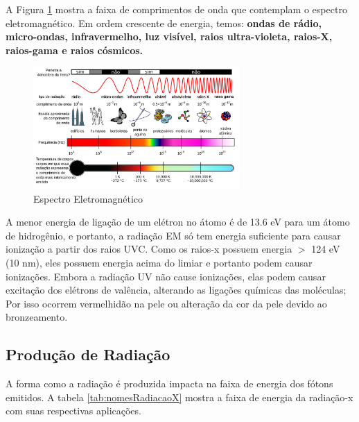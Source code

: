 \documentclass[11pt,a4paper]{article}
\begin{document}
                A Figura \ref{fig:espectroEM} mostra a faixa de comprimentos de onda que contemplam o espectro eletromagnético. Em ordem crescente de energia, temos: \textbf{ondas de rádio, micro-ondas, infravermelho, luz visível, raios ultra-violeta, raios-X, raios-gama e raios cósmicos.}

                \begin{figure}[h]
                    \centering
                    \includegraphics[width=0.7\textwidth]{Imagens/espectroEM.jpg}
                    \caption{Espectro Eletromagnético}
                    \label{fig:espectroEM}
                \end{figure}

                 A menor energia de ligação de um elétron no átomo é de 13.6 eV para um átomo de hidrogênio, e portanto, a radiação EM só tem energia suficiente para causar ionização a partir dos raios UVC. Como os raios-x possuem energia $>$ 124 eV (10 nm), eles possuem energia acima do limiar e portanto podem causar ionizações. Embora a radiação UV não cause ionizações, elas podem causar excitação dos elétrons de valência, alterando as ligações químicas das moléculas; Por isso ocorrem vermelhidão na pele ou alteração da cor da pele devido ao bronzeamento.

        \subsection{Produção de Radiação}
                
            A forma como a radiação é produzida impacta na faixa de energia dos fótons emitidos. A tabela \ref{tab:nomesRadiacaoX} mostra a faixa de energia da radiação-x com suas respectivas aplicações.
\end{document}
